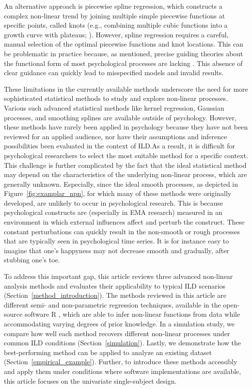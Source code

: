 \documentclass[man, floatsintext]{apa7}
\begin{document}
An alternative approach is piecewise spline regression, which constructs a
complex non-linear trend by joining multiple simple piecewise functions at
specific points, called knots (e.g., combining multiple cubic functions into a
growth curve with plateaus; \textcite{tsay_nonlinear_2019}). However, spline
regression requires a careful, manual selection of the optimal piecewise
functions and knot locations. This can be problematic in practice because, as
mentioned, precise guiding theories about the functional form of most
psychological processes are lacking \parencite{tan_time-varying_2011}. This
absence of clear guidance can quickly lead to misspecified models and invalid
results.

These limitations in the currently available methods underscore the need for
more sophisticated statistical methods to study and explore non-linear
processes. Various such advanced statistical methods like kernel regression,
Gaussian processes, and smoothing splines are available outside of psychology.
However, these methods have rarely been applied in psychology because they have
not been reviewed for an applied audience, nor have their assumptions and
inference possibilities been evaluated in the context of ILD.\@ As a result, it
is difficult for psychological researchers to select the most suitable method
for a specific context. This challenge is further complicated by the fact that
the ideal statistical method may depend on the characteristics of the
underlying non-linear process, which are generally unknown. Especially, since
the ideal smooth processes, as depicted in Figure~\ref{fig:examplar_npn}, for
which many of these methods were originally developed, are unlikely to occur in
psychological research. This is because psychological constructs are
(especially in EMA research) measured in an environment in which external
influences affect and perturb the construct. These constant perturbations can
quickly result in the non-smooth or rough processes that are typically seen
in psychological time series. It is for instance easy to imagine that one's
happyness may not decrease smooth and gradually, after stubbing one's toe.

To address this important gap, this article reviews three advanced non-linear
analysis methods and evaluates their applicability to typical ILD scenarios
(Section~\ref{method_introduction}). The methods reviewed in this article are
different semi- and non-parametric regression techniques, available in the
open-source software R \parencite{R-base}, which are able to infer non-linear
functions from data while accommodating varying degrees of prior knowledge. In
a simulation study, we compare how well each method recovers different
non-linear processes under common ILD conditions (Section~\ref{simulation}).
Lastly, we demonstrate how the best-performing method can be applied to analyze
an existing dataset (Section~\ref{empirical_example}). Further, to introduce
these methods accessibly and apply them under conditions where software
implementations are available, this article focuses on the univariate
single-subject design.
\end{document}
